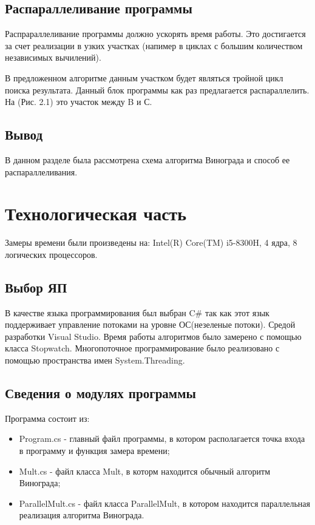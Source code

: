 \documentclass[12pt]{report}
\begin{document}
\newpage

\section{Распараллеливание программы}
Распрараллеливание программы должно ускорять время работы. Это достигается за счет реализации в узких участках (напимер в циклах с большим количеством независимых вычилений).

В предложенном алгоритме данным участком будет являться тройной цикл поиска результата.
Данный блок программы как раз предлагается распараллелить.
На (Рис. 2.1) это участок между B и С. 

\section{Вывод}
В данном разделе была рассмотрена схема алгоритма Винограда и способ ее распараллеливания.

 

\chapter{Технологическая часть}
Замеры времени были произведены на: Intel(R) Core(TM) i5-8300H, 4 ядра, 8 логических процессоров.

\section{Выбор ЯП}
В качестве языка программирования был выбран C\# \cite{Microsoft} так как этот
язык поддерживает управление потоками на уровне ОС(незеленые потоки). Средой разработки Visual Studio. 
Время работы алгоритмов было замерено с помощью класса Stopwatch. Многопоточное программирование было
реализовано с помощью пространства имен System.Threading.

\section{Сведения о модулях программы}
Программа состоит из:
\begin{itemize}
	\item Program.cs - главный файл программы, в котором располагается точка входа в программу и функция замера времени;
	\item Mult.cs - файл класса Mult, в которм находится обычный алгоритм Винограда;
	\item ParallelMult.cs - файл класса ParallelMult, в котором находится параллельная реализация алгоритма Винограда.
\end{itemize}
\end{document}

